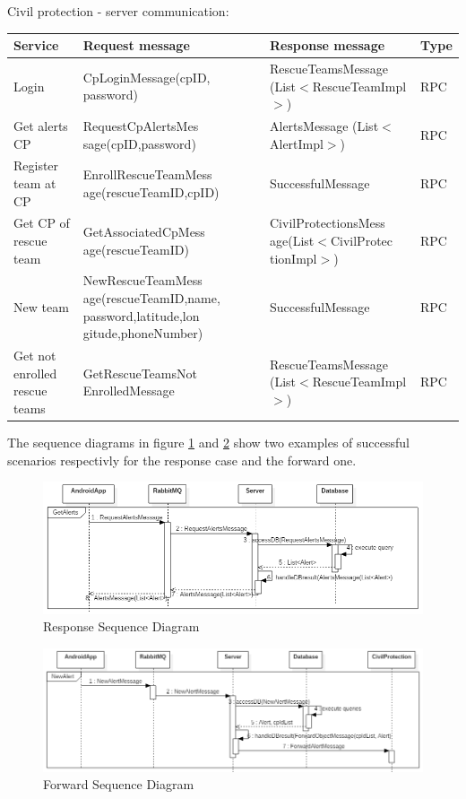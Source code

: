 \documentclass[a4paper,12pt]{report}
\begin{document}
Civil protection - server communication:

\begin{center}
\begin{tabular}{ |p{3.5cm}|p{4.6cm}|p{4.6cm}|p{1.3cm}| } 
\hline
Service 			& Request message 	& Response message		& Type 	\\
\hline
Login	& CpLoginMessage(cpID, password)	& RescueTeamsMessage (List$<$RescueTeamImpl$>$) 	& RPC	\\ 
Get alerts CP	& RequestCpAlertsMes sage(cpID,password)	& AlertsMessage (List$<$AlertImpl$>$) 	& RPC	\\ 
Register team at CP		& EnrollRescueTeamMess age(rescueTeamID,cpID)	& SuccessfulMessage & RPC	\\ 
Get CP of rescue team 	& GetAssociatedCpMess age(rescueTeamID)		& CivilProtectionsMess age(List$<$CivilProtec tionImpl$>$)	& RPC	\\ 
New team	& NewRescueTeamMess age(rescueTeamID,name, password,latitude,lon gitude,phoneNumber)	& SuccessfulMessage	& RPC	\\
Get not enrolled rescue teams & GetRescueTeamsNot EnrolledMessage	& RescueTeamsMessage (List$<$RescueTeamImpl$>$)	& RPC	\\
\hline
\end{tabular}
\end{center}

The sequence diagrams in figure \ref{fig:seqRPC} and \ref{fig:seqForward} show two examples of successful scenarios respectivly for the response case and the forward one.

\begin{figure}[ht]
\centering
\includegraphics[scale=0.5]{figures/seqRPC.png}
\caption{Response Sequence Diagram}
\label{fig:seqRPC}
\end{figure}

\begin{figure}[ht]
\centering
\includegraphics[scale=0.5]{figures/seqForward.png}
\caption{Forward Sequence Diagram}
\label{fig:seqForward}
\end{figure}
\end{document}
